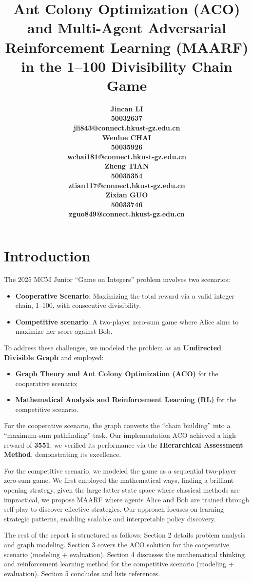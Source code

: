 \documentclass[twocolumn, a4paper]{article}
\title{Ant Colony Optimization (ACO) and Multi-Agent Adversarial Reinforcement Learning (MAARF) in the 1--100 Divisibility Chain Game}
\author{
    \begin{minipage}[t]{0.23\textwidth}
        \centering
        \small\bfseries Jincan LI\\
        \tiny 50032637\\
        \tiny jli843@connect.hkust-gz.edu.cn
    \end{minipage}
    \hfill
    \begin{minipage}[t]{0.23\textwidth}
        \centering
        \small\bfseries Wenlue CHAI\\
        \tiny 50035926\\
        \tiny wchai181@connect.hkust-gz.edu.cn
    \end{minipage}
    \hfill
    \begin{minipage}[t]{0.23\textwidth}
        \centering
        \small\bfseries Zheng TIAN\\
        \tiny 50035354\\
        \tiny ztian117@connect.hkust-gz.edu.cn
    \end{minipage}
    \hfill
    \begin{minipage}[t]{0.23\textwidth}
        \centering
        \small\bfseries Zixian GUO\\
        \tiny 50033746\\
        \tiny zguo849@connect.hkust-gz.edu.cn
    \end{minipage}
}
\date{} %
\begin{document}
\maketitle


\section{Introduction}
The 2025 MCM Junior ``Game on Integers'' problem involves two scenarios: 
\begin{itemize}
    \item \textbf{Cooperative Scenario}: Maximizing the total reward via a valid integer chain, 1--100, with consecutive divisibility.
    \item \textbf{Competitive scenario}: A two-player zero-sum game where Alice aims to maximize her score against Bob.
\end{itemize}
To address these challenges, we modeled the problem as an \textbf{Undirected Divisible Graph} and employed:
\begin{itemize}
    \item \textbf{Graph Theory and Ant Colony Optimization (ACO)} for the cooperative scenario; 
    \item \textbf{Mathematical Analysis and Reinforcement Learning (RL)} for the competitive scenario.
\end{itemize}

For the cooperative scenario, the graph converts the ``chain building'' into a ``maximum-sum pathfinding'' task. Our implementation ACO achieved a high reward of \textbf{3551}; we verified its performance via the \textbf{Hierarchical Assessment Method}, demonstrating its excellence.

For the competitive scenario, we modeled the game as a sequential two-player zero-sum game. We first employed the mathematical ways, finding a brilliant opening strategy, given the large latter state space where classical methods are impractical, we propose MAARF where agents Alice and Bob are trained through self-play to discover effective strategies. Our approach focuses on learning strategic patterns, enabling scalable and interpretable policy discovery.

The rest of the report is structured as follows: Section 2 details problem analysis and graph modeling. Section 3 covers the ACO solution for the cooperative scenario (modeling + evaluation). Section 4 discusses the mathematical thinking and reinforcement learning method for the competitive scenario (modeling + evaluation). Section 5 concludes and lists references.
\end{document}
